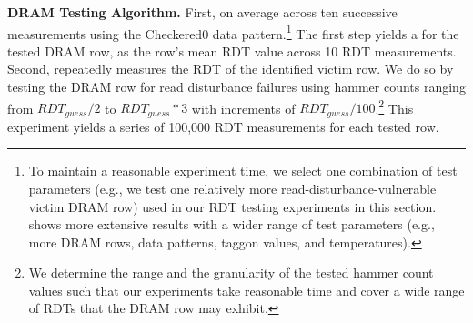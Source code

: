 \noindent
\textbf{DRAM Testing Algorithm.} 
First, 
on average across ten successive measurements using the
Checkered0 data pattern.\footnote{To maintain a reasonable experiment time, we
select one combination of test parameters (e.g., we test one relatively more
read-disturbance-vulnerable victim DRAM row) used in our RDT testing experiments
in this section.  shows more extensive results with a wider
range of test parameters (e.g., more DRAM rows, data patterns, \gls{taggon}
values, and temperatures).} The first step yields a  for the tested DRAM row, as the row's mean RDT value
across 10 RDT measurements. Second,  repeatedly measures
the RDT of the identified victim row. We do so by testing the DRAM row for read
disturbance failures using hammer counts ranging from $RDT_{guess}/2$ to
$RDT_{guess}*3$ with increments of $RDT_{guess}/100$.\footnote{We
 determine the range and the granularity of the tested hammer
count values such that our experiments take reasonable time and cover a wide
range of RDTs that the DRAM row may exhibit.} This experiment yields a series of
100,000  
RDT measurements for each tested row. 


